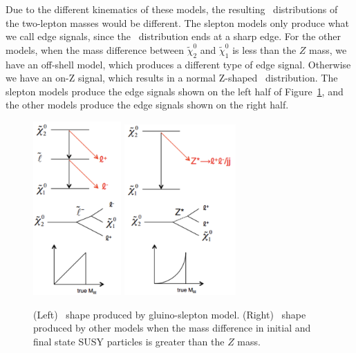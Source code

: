 Due to the different kinematics of these models, the resulting \mll\ distributions of the two-lepton masses would be different. The slepton models only produce what we call edge signals, since the \mll\ distribution ends at a sharp edge. For the other models, when the mass difference between $\tilde{\chi}_{2}^{0}$ and $\tilde{\chi}_{1}^{0}$ is less than the $Z$ mass, we have an off-shell model, which produces a different type of edge signal. Otherwise we have an on-Z signal, which results in a normal Z-shaped \mll\ distribution. The slepton models produce the edge signals shown on the left half of Figure~\ref{fig:edge_signals}, and the other models produce the edge signals shown on the right half.

\begin{figure}[htbp]
    \centering
    \includegraphics[width=0.3\textwidth]{Images/SUSY/slepton_edge.png}
    \includegraphics[width=0.38\textwidth]{Images/SUSY/Z_edge.png}
    \caption{(Left) \mll\ shape produced by gluino-slepton model. (Right) \mll\ shape produced by other models when the mass difference in initial and final state SUSY particles is greater than the $Z$ mass.}
    \label{fig:edge_signals}
\end{figure}

